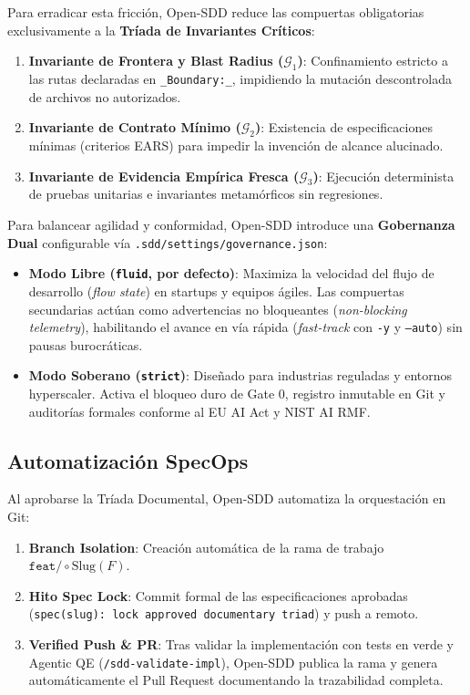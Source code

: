 \documentclass[11pt,a4paper]{article}
\begin{document}
Para erradicar esta fricción, Open-SDD reduce las compuertas obligatorias exclusivamente a la \textbf{Tríada de Invariantes Críticos}:
\begin{enumerate}
    \item \textbf{Invariante de Frontera y Blast Radius ($\mathcal{G}_1$)}: Confinamiento estricto a las rutas declaradas en \texttt{\_Boundary:\_}, impidiendo la mutación descontrolada de archivos no autorizados.
    \item \textbf{Invariante de Contrato Mínimo ($\mathcal{G}_2$)}: Existencia de especificaciones mínimas (criterios EARS) para impedir la invención de alcance alucinado.
    \item \textbf{Invariante de Evidencia Empírica Fresca ($\mathcal{G}_3$)}: Ejecución determinista de pruebas unitarias e invariantes metamórficos sin regresiones.
\end{enumerate}

Para balancear agilidad y conformidad, Open-SDD introduce una \textbf{Gobernanza Dual} configurable vía \texttt{.sdd/settings/governance.json}:
\begin{itemize}
    \item \textbf{Modo Libre (\texttt{fluid}, por defecto)}: Maximiza la velocidad del flujo de desarrollo (\textit{flow state}) en startups y equipos ágiles. Las compuertas secundarias actúan como advertencias no bloqueantes (\textit{non-blocking telemetry}), habilitando el avance en vía rápida (\textit{fast-track} con \texttt{-y} y \texttt{--auto}) sin pausas burocráticas.
    \item \textbf{Modo Soberano (\texttt{strict})}: Diseñado para industrias reguladas y entornos hyperscaler. Activa el bloqueo duro de Gate 0, registro inmutable en Git y auditorías formales conforme al EU AI Act y NIST AI RMF.
\end{itemize}

\subsection{Automatización SpecOps}
Al aprobarse la Tríada Documental, Open-SDD automatiza la orquestación en Git:
\begin{enumerate}
    \item \textbf{Branch Isolation}: Creación automática de la rama de trabajo $\texttt{feat/} \circ \text{Slug}(F)$.
    \item \textbf{Hito Spec Lock}: Commit formal de las especificaciones aprobadas (\texttt{spec(slug): lock approved documentary triad}) y push a remoto.
    \item \textbf{Verified Push \& PR}: Tras validar la implementación con tests en verde y Agentic QE (\texttt{/sdd-validate-impl}), Open-SDD publica la rama y genera automáticamente el Pull Request documentando la trazabilidad completa.
\end{enumerate}
\end{document}

